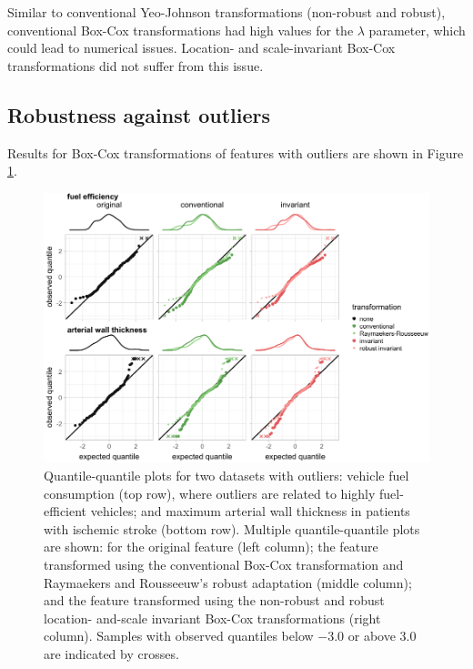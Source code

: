 \documentclass[preprint,12pt,authoryear]{elsarticle}
\begin{document}
Similar to conventional Yeo-Johnson transformations (non-robust and
robust), conventional Box-Cox transformations had high values for the
\(\lambda\) parameter, which could lead to numerical issues. Location-
and scale-invariant Box-Cox transformations did not suffer from this
issue.

\subsection{Robustness against
outliers}\label{robustness-against-outliers}

Results for Box-Cox transformations of features with outliers are shown
in Figure \ref{fig:experimental-results-outlier-robustness-appendix}.

\begin{figure}

{\centering \includegraphics{figure_appendix_3} 

}

\caption{Quantile-quantile plots for two datasets with outliers: vehicle fuel consumption (top row), where outliers are related to highly fuel-efficient vehicles; and maximum arterial wall thickness in patients with ischemic stroke (bottom row). Multiple quantile-quantile plots are shown: for the original feature (left column); the feature transformed using the conventional Box-Cox transformation and Raymaekers and Rousseeuw's robust adaptation (middle column); and the feature transformed using the non-robust and robust location- and-scale invariant Box-Cox transformations (right column). Samples with observed quantiles below $-3.0$ or above $3.0$ are indicated by crosses.}\label{fig:experimental-results-outlier-robustness-appendix}
\end{figure}
\end{document}
